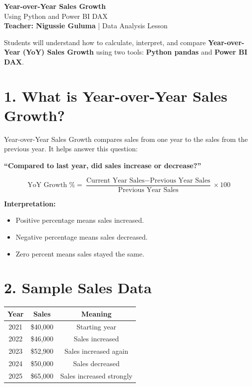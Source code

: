 \documentclass[11pt]{article}
\begin{document}
\begin{center}
    {\Huge \bfseries \color{DeepNavy} Year-over-Year Sales Growth}\\[4pt]
    {\Large Using Python and Power BI DAX}\\[6pt]
    \textbf{Teacher: Nigussie Guluma} \quad | \quad Data Analysis Lesson
\end{center}

\begin{tcolorbox}[colback=LightBlue,colframe=DeepNavy,title=Learning Goal]
Students will understand how to calculate, interpret, and compare \textbf{Year-over-Year (YoY) Sales Growth} using two tools: \textbf{Python pandas} and \textbf{Power BI DAX}.
\end{tcolorbox}

\section{1. What is Year-over-Year Sales Growth?}
Year-over-Year Sales Growth compares sales from one year to the sales from the previous year. It helps answer this question:

\begin{center}
\textbf{``Compared to last year, did sales increase or decrease?''}
\end{center}

\begin{tcolorbox}[colback=LightGray,colframe=DeepNavy,title=Formula]
\[
\text{YoY Growth \%} = \frac{\text{Current Year Sales} - \text{Previous Year Sales}}{\text{Previous Year Sales}} \times 100
\]
\end{tcolorbox}

\textbf{Interpretation:}
\begin{itemize}[itemsep=2pt]
    \item Positive percentage means sales increased.
    \item Negative percentage means sales decreased.
    \item Zero percent means sales stayed the same.
\end{itemize}

\section{2. Sample Sales Data}
\begin{center}
\begin{tabular}{ccc}
\toprule
\textbf{Year} & \textbf{Sales} & \textbf{Meaning} \\
\midrule
2021 & \$40,000 & Starting year \\
2022 & \$46,000 & Sales increased \\
2023 & \$52,900 & Sales increased again \\
2024 & \$50,000 & Sales decreased \\
2025 & \$65,000 & Sales increased strongly \\
\bottomrule
\end{tabular}
\end{center}
\end{document}

